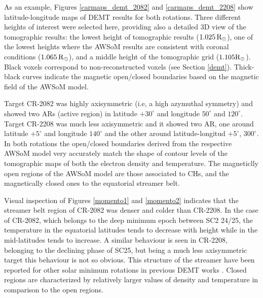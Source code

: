 \documentclass[namedreferences]{solarphysics}
\newcommand{\mdeg}{^\circ}
\newcommand{\mrsun}{{\rm R_\odot}}
\begin{document}
\begin{article}
{As an example,} Figures \ref{carmaps_demt_2082} and \ref{carmaps_demt_2208} show {latitude-longitude} maps of DEMT results for both {rotations. Three different heights of interest were selected here, providing also a detailed 3D view of the tomographic results: the lowest height of tomographic results ($1.025\,\mrsun$), one of the lowest heights where the AWSoM results are consistent with coronal conditions ($1.065\,\mrsun$), and a middle height of the tomographic grid ($1.105\mrsun$)}. Black voxels correspond to non-reconstructed voxels ({see} Section \ref{demt}). Thick-black {curves indicate} the magnetic open/closed {boundaries} based on the magnetic field of {the} AWSoM model. 

{Target} CR-2082 was highly axisymmetric {(i.e, a high azymuthal symmetry)} and showed two ARs (active region) in latitude $+30\mdeg$ and longitude $50\mdeg$ and $120\mdeg$. {Target CR-2208 was much less axisymmetric and it} showed two AR, one around latitude $+5\mdeg$ and longitude $140\mdeg$ and the other around latitude-longitud $+5\mdeg$, $300\mdeg$. {In both rotations the open/closed} boundaries derived from the respective AWSoM model {very accurately} match the shape of {contour levels} of the tomographic maps of both the {electron density and temperature. The magneticlly open regions of the AWSoM model are those associated to CHs, and the magnetically closed ones to the equatorial streamer belt.} 

{Visual inspection of Figures \ref{momento1} and \ref{momento2} indicates} that the streamer belt region of CR-2082 was denser and colder than CR-2208. {In the case of CR-2082, which belongs to the deep minimum epoch between SC2 24/25, the temperature in the equatorial latitudes tends to decrease with height while in the mid-latitudes tends to increase. A similar behaviour is seen in CR-2208, belonging to the declining phase of SC25, but being a much less axisymmetric target this behaviour is not so obvious. This structure of the streamer have been reported for other solar minimum rotations in previous DEMT works \citep{lloveras_2017,nuevo_2013,vasquez_2010}.} Closed regions are characterized by relatively larger values of density and temperature in comparison to the open regions.


\end{article}
\end{document}
